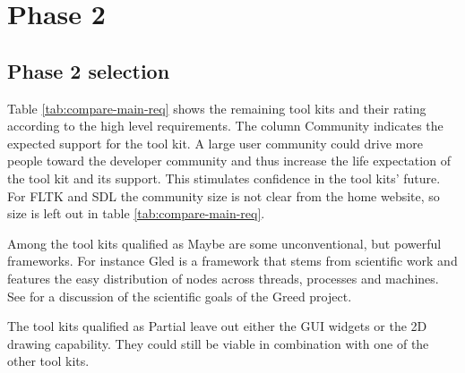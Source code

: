 \section{Phase 2}

\subsection{Phase 2 selection}

Table \ref{tab:compare-main-req} shows the remaining tool kits and their 
rating according to the high level requirements. The column {\sc Community} 
indicates the expected support for the tool kit. A large user 
community could drive more people toward the developer community and thus
increase the life expectation of the tool kit and its support. 
This stimulates confidence in the tool kits' future.
For {\sf FLTK} and {\sf SDL} the community size is not clear from the home website,
so size is left out in table \ref{tab:compare-main-req}.

Among the tool kits qualified as {\sf\sc Maybe} are some unconventional, but
powerful frameworks. For instance {\sc Gled} is a framework that stems from
scientific work and features the easy distribution of nodes across threads,
processes and machines. See \cite{greed:gled} for a discussion of the scientific
goals of the {\sc\sf Greed} project.


The tool kits qualified as {\sf\sc Partial} leave out either the GUI widgets or 
the 2D drawing capability. They could still be viable in combination with one
of the other tool kits.

